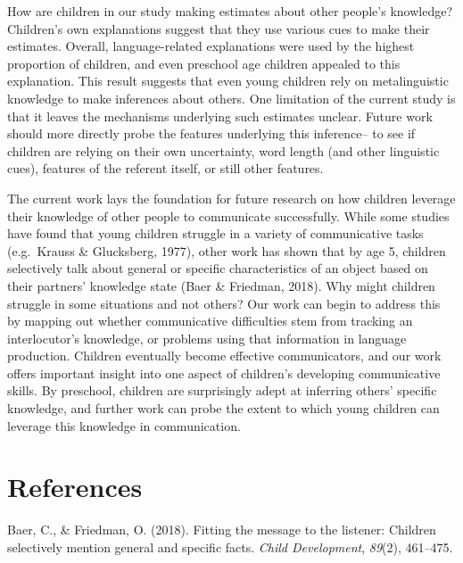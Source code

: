 \documentclass[10pt, letterpaper]{article}
\begin{document}
How are children in our study making estimates about other people's
knowledge? Children's own explanations suggest that they use various
cues to make their estimates. Overall, language-related explanations
were used by the highest proportion of children, and even preschool age
children appealed to this explanation. This result suggests that even
young children rely on metalinguistic knowledge to make inferences about
others. One limitation of the current study is that it leaves the
mechanisms underlying such estimates unclear. Future work should more
directly probe the features underlying this inference-- to see if
children are relying on their own uncertainty, word length (and other
linguistic cues), features of the referent itself, or still other
features.

The current work lays the foundation for future research on how children
leverage their knowledge of other people to communicate successfully.
While some studies have found that young children struggle in a variety
of communicative tasks (e.g.~Krauss \& Glucksberg, 1977), other work has
shown that by age 5, children selectively talk about general or specific
characteristics of an object based on their partners' knowledge state
(Baer \& Friedman, 2018). Why might children struggle in some situations
and not others? Our work can begin to address this by mapping out
whether communicative difficulties stem from tracking an interlocutor's
knowledge, or problems using that information in language production.
Children eventually become effective communicators, and our work offers
important insight into one aspect of children's developing communicative
skills. By preschool, children are surprisingly adept at inferring
others' specific knowledge, and further work can probe the extent to
which young children can leverage this knowledge in communication.

\vspace{1em} 

\hypertarget{references}{%
\section{References}\label{references}}

\setlength{\parindent}{-0.1in} 
\setlength{\leftskip}{0.125in}

\noindent

\hypertarget{refs}{}
\leavevmode\hypertarget{ref-baer2018}{}%
Baer, C., \& Friedman, O. (2018). Fitting the message to the listener:
Children selectively mention general and specific facts. \emph{Child
Development}, \emph{89}(2), 461--475.
\end{document}
